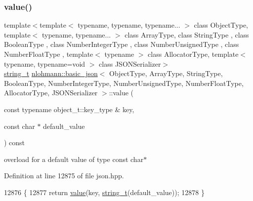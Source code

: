 \subsubsection{\texorpdfstring{value()}{value()}\hspace{0.1cm}{\footnotesize\ttfamily [2/4]}}
{\footnotesize\ttfamily template$<$template$<$ typename, typename, typename... $>$ class Object\+Type, template$<$ typename, typename... $>$ class Array\+Type, class String\+Type , class Boolean\+Type , class Number\+Integer\+Type , class Number\+Unsigned\+Type , class Number\+Float\+Type , template$<$ typename $>$ class Allocator\+Type, template$<$ typename, typename=void $>$ class J\+S\+O\+N\+Serializer$>$ \\
\hyperlink{classnlohmann_1_1basic__json_a61f8566a1a85a424c7266fb531dca005}{string\+\_\+t} \hyperlink{classnlohmann_1_1basic__json}{nlohmann\+::basic\+\_\+json}$<$ Object\+Type, Array\+Type, String\+Type, Boolean\+Type, Number\+Integer\+Type, Number\+Unsigned\+Type, Number\+Float\+Type, Allocator\+Type, J\+S\+O\+N\+Serializer $>$\+::value (\begin{DoxyParamCaption}\item[{const typename object\+\_\+t\+::key\+\_\+type \&}]{key,  }\item[{const char $\ast$}]{default\+\_\+value }\end{DoxyParamCaption}) const\hspace{0.3cm}{\ttfamily [inline]}}



overload for a default value of type const char$\ast$ 



Definition at line 12875 of file json.\+hpp.


\begin{DoxyCode}
12876     \{
12877         \textcolor{keywordflow}{return} \hyperlink{classnlohmann_1_1basic__json_adcf8ca5079f5db993820bf50036bf45d}{value}(key, \hyperlink{classnlohmann_1_1basic__json_a61f8566a1a85a424c7266fb531dca005}{string\_t}(default\_value));
12878     \}
\end{DoxyCode}
\mbox{\label{classnlohmann_1_1basic__json_a671aea68432ecb28770bbc482918f023}} 
